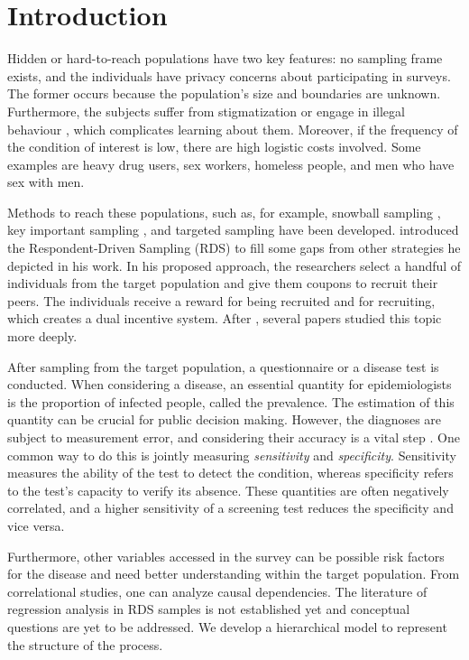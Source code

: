 \chapter{Introduction}

Hidden or hard-to-reach populations have two key features: no sampling frame
exists, and the individuals have privacy concerns about participating in
surveys. The former occurs because the population's size and boundaries are
unknown. Furthermore, the subjects suffer from stigmatization or engage in illegal
behaviour \cite{heckathorn1997}, which complicates learning about them.
Moreover, if the frequency of the condition of interest is low, there are high logistic
costs
involved. Some examples are heavy drug users, sex workers, homeless people,
and men who have sex with men.

Methods to reach these populations, such as, for example, snowball sampling \cite{goodman1961}, key
important sampling \cite{deaux-callaghan1985}, 
and targeted sampling \cite{watters-biernacki1989} have been developed. \textcite{heckathorn1997} introduced the Respondent-Driven Sampling (RDS) to fill some gaps from other strategies he depicted in his work. In his proposed approach, the researchers select a handful of individuals from the target population and give them coupons to recruit their peers. The individuals receive a reward for being recruited and for recruiting, which creates a dual incentive system. After \textcite{heckathorn1997}, several papers studied this topic more deeply. 

After sampling from the target population, a questionnaire or a disease test
is conducted. When considering a disease, an essential quantity
for epidemiologists is the proportion of infected people, called the
prevalence. The estimation of this quantity can be crucial for public
decision making. However, the diagnoses are subject to measurement error, and considering
their accuracy is
a vital step \cite{reitsma2005bivariate}. One common way to do this is jointly measuring {\em
sensitivity} and {\em specificity}. Sensitivity measures the ability of the
test to detect the condition, whereas specificity refers to the test's
capacity to verify its absence. These quantities are often negatively
correlated, and a higher sensitivity of a screening test reduces the
specificity and vice versa.

Furthermore, other variables accessed in the survey can be possible risk
factors for the disease and need better understanding within the target
population. From correlational studies, one can analyze causal dependencies. 
The literature of
regression analysis in RDS samples is not established yet \cite[p.
15]{avery2021statistical} and conceptual questions are yet to be addressed. 
We develop a hierarchical model to represent the structure of the process. 

